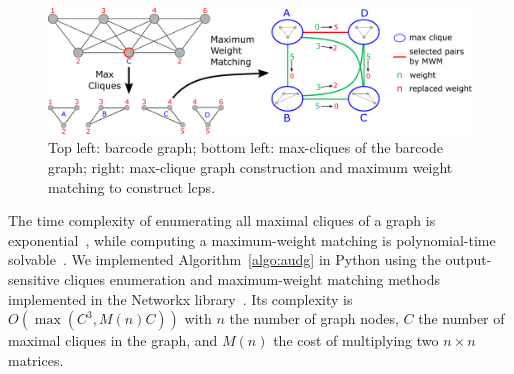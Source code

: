 \begin{figure}[htp]
    \centering
    \includegraphics[width=.95\textwidth]{mwm_v2.pdf} %
    \caption{Top left: barcode graph; bottom left: max-cliques of the barcode graph; right: max-clique graph construction and maximum weight matching to construct lcps.}
    \label{fig:mwm}
\end{figure}

The time complexity of enumerating all maximal cliques of a graph is exponential~\cite{TomitaTT_2006}, while computing a maximum-weight matching is polynomial-time solvable~\cite{Galil_1986}. 
We implemented Algorithm~\ref{algo:audg} in Python using the output-sensitive cliques enumeration and maximum-weight matching methods implemented in the Networkx library~\cite{HagbergSS_2008}. Its complexity is $O(\max(C^3, M(n) C))$ with $n$ the number of graph nodes, $C$ the number of maximal cliques in the graph, and  $M(n)$ the cost of multiplying two $n\times n$ matrices.

